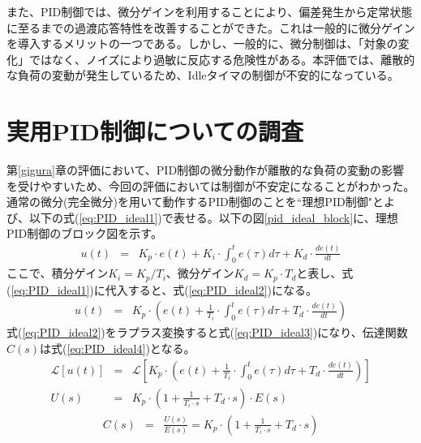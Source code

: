 \documentclass[a4j]{ujarticle}
\begin{document}
また、PID制御では、微分ゲインを利用することにより、偏差発生から定常状態に至るまでの過渡応答特性を改善することができた。これは一般的に微分ゲインを導入するメリットの一つである。しかし、一般的に、微分制御は、「対象の変化」ではなく、ノイズにより過敏に反応する危険性がある。本評価では、離散的な負荷の変動が発生しているため、Idleタイマの制御が不安的になっている。

\clearpage
\section{実用PID制御についての調査}
第\ref{gigura}章の評価において、PID制御の微分動作が離散的な負荷の変動の影響を受けやすいため、今回の評価においては制御が不安定になることがわかった。通常の微分(完全微分)を用いて動作するPID制御のことを``理想PID制御"とよび、以下の式(\ref{eq:PID_ideal1})で表せる。以下の図\ref{pid_ideal_block}に、理想PID制御のブロック図を示す。
\begin{eqnarray}
  u(t) &=& K_p \cdot e(t) + K_i \cdot \int_0^t e(\tau) d\tau + K_d \cdot \frac{de(t)}{dt}
  \label{eq:PID_ideal1}
\end{eqnarray}
ここで、積分ゲイン$K_i = K_p / T_i$、微分ゲイン$K_d = K_p \cdot T_d$と表し、式(\ref{eq:PID_ideal1})に代入すると、式(\ref{eq:PID_ideal2})になる。
\begin{eqnarray}
  u(t) &=& K_p \cdot (e(t) + \frac{1}{T_i} \cdot \int_0^t e(\tau) d\tau +  T_d \cdot \frac{de(t)}{dt})
  \label{eq:PID_ideal2}
\end{eqnarray}
式(\ref{eq:PID_ideal2})をラプラス変換すると式(\ref{eq:PID_ideal3})になり、伝達関数$C(s)$は式(\ref{eq:PID_ideal4})となる。
\begin{eqnarray}
  \mathcal{L}[u(t)] &=& \mathcal{L}[K_p \cdot (e(t) + \frac{1}{T_i} \cdot \int_0^t e(\tau) d\tau +  T_d \cdot \frac{de(t)}{dt})] \nonumber\\
  U(s) &=& K_p \cdot (1 + \frac{1}{T_i \cdot s}  +  T_d \cdot s) \cdot E(s)
  \label{eq:PID_ideal3}
\end{eqnarray}
\begin{eqnarray}
  C(s) &=& \frac{U(s)}{E(s)} = K_p \cdot (1 + \frac{1}{T_i \cdot s}  +  T_d \cdot s)
  \label{eq:PID_ideal4}
\end{eqnarray}
\end{document}
